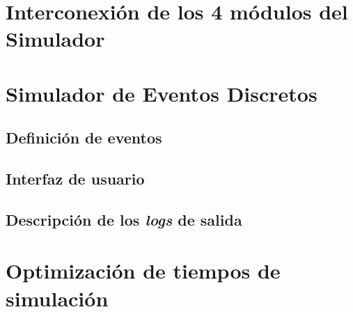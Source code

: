 
\section{Interconexión de los 4 módulos del Simulador}


\section{Simulador de Eventos Discretos}

\subsection{Definición de eventos}

\subsection{Interfaz de usuario}

\subsection{Descripción de los \textit{logs} de salida}


\section{Optimización de tiempos de simulación}

